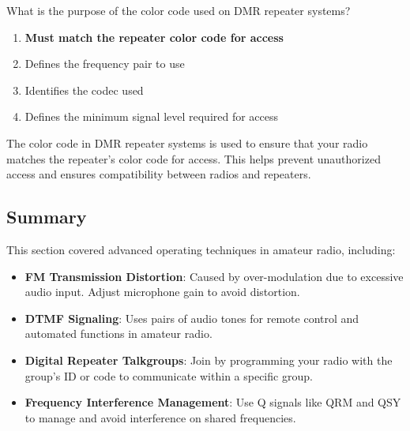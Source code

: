 
\begin{tcolorbox}[colback=gray!10!white,colframe=black!75!black,title={T2B12}]
    What is the purpose of the color code used on DMR repeater systems?
    \begin{enumerate}[label=\Alph*),noitemsep]
        \item \textbf{Must match the repeater color code for access}
        \item Defines the frequency pair to use
        \item Identifies the codec used
        \item Defines the minimum signal level required for access
    \end{enumerate}
\end{tcolorbox}
The color code in DMR repeater systems is used to ensure that your radio matches the repeater's color code for access. This helps prevent unauthorized access and ensures compatibility between radios and repeaters.


\subsection*{Summary}
This section covered advanced operating techniques in amateur radio, including:
\begin{itemize}
    \item \textbf{FM Transmission Distortion}: Caused by over-modulation due to excessive audio input. Adjust microphone gain to avoid distortion.
    \item \textbf{DTMF Signaling}: Uses pairs of audio tones for remote control and automated functions in amateur radio.
    \item \textbf{Digital Repeater Talkgroups}: Join by programming your radio with the group's ID or code to communicate within a specific group.
    \item \textbf{Frequency Interference Management}: Use Q signals like QRM and QSY to manage and avoid interference on shared frequencies.
\end{itemize}
